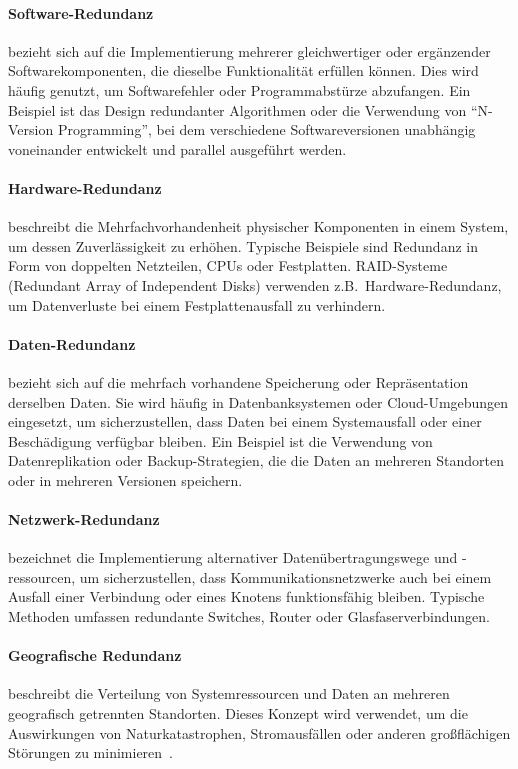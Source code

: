 \paragraph{Software-Redundanz} bezieht sich auf die Implementierung mehrerer gleichwertiger oder ergänzender
Softwarekomponenten, die dieselbe Funktionalität erfüllen können.
Dies wird häufig genutzt, um Softwarefehler oder Programmabstürze abzufangen.
Ein Beispiel ist das Design redundanter Algorithmen oder die Verwendung von \enquote{N-Version Programming}, bei
dem verschiedene Softwareversionen unabhängig voneinander entwickelt und parallel ausgeführt werden.
\paragraph{Hardware-Redundanz} beschreibt die Mehrfachvorhandenheit physischer Komponenten in einem System, um
dessen Zuverlässigkeit zu erhöhen.
Typische Beispiele sind Redundanz in Form von doppelten Netzteilen, CPUs oder Festplatten.
RAID-Systeme (Redundant Array of Independent Disks) verwenden z.B.\ Hardware-Redundanz,
um Datenverluste bei einem Festplattenausfall zu verhindern.
\paragraph{Daten-Redundanz} bezieht sich auf die mehrfach vorhandene Speicherung oder Repräsentation derselben Daten.
Sie wird häufig in Datenbanksystemen oder Cloud-Umgebungen eingesetzt, um sicherzustellen, dass Daten bei einem
Systemausfall oder einer Beschädigung verfügbar bleiben.
Ein Beispiel ist die Verwendung von Datenreplikation oder Backup-Strategien, die die Daten an mehreren
Standorten oder in mehreren Versionen speichern.
\paragraph{Netzwerk-Redundanz} bezeichnet die Implementierung alternativer Datenübertragungswege und -ressourcen,
um sicherzustellen, dass Kommunikationsnetzwerke auch bei einem Ausfall einer Verbindung oder eines Knotens
funktionsfähig bleiben.
Typische Methoden umfassen redundante Switches, Router oder Glasfaserverbindungen.
\paragraph{Geografische Redundanz} beschreibt die Verteilung von Systemressourcen und Daten an mehreren geografisch
getrennten Standorten.
Dieses Konzept wird verwendet, um die Auswirkungen von Naturkatastrophen, Stromausfällen oder
anderen großflächigen Störungen zu minimieren~\cite{g4g-redundancy}.


